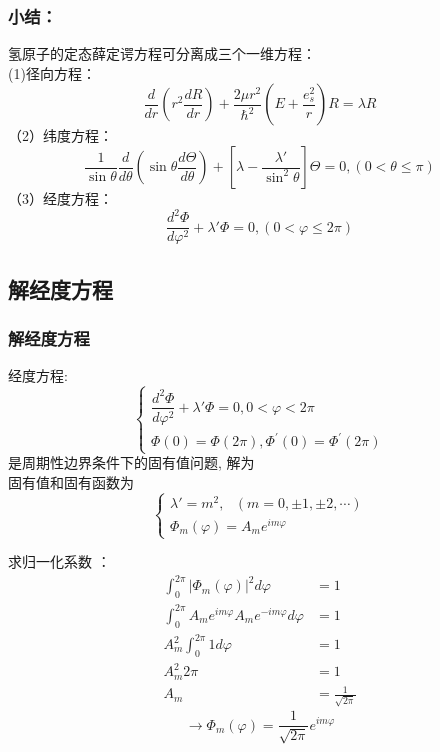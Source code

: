 \begin{frame}[label=current]
\frametitle{小结：}
氢原子的定态薛定谔方程可分离成三个一维方程：\\
(1)径向方程：
\begin{equation*}
  \frac{d}{d r} (r^2\frac{d R }{d r} ) + \frac{2 \mu r^2} {\hbar^2}(E+ \frac{e_s ^2}{r} ) R =\lambda R
\end{equation*}
（2）纬度方程：
\begin{equation*}\label{eq:theta}
  \frac{1}{\sin \theta} \frac{d}{d \theta}\left(\sin \theta \frac{d \Theta}{d \theta}\right)+\left[\lambda-\frac{\lambda'}{\sin ^{2} \theta}\right] \Theta=0,(0<\theta \le \pi)
\end{equation*}		
（3）经度方程：
\begin{equation*}\label{eq:varphi}
  \frac{d^{2} \Phi}{d \varphi^{2}}+\lambda' \Phi=0,(0<\varphi\le2 \pi)
\end{equation*}	  

\end{frame} 

\subsection{解经度方程}
\begin{frame}
\frametitle{解经度方程}
经度方程:\\
\[\begin{cases}
  \dfrac{d^{2} \Phi}{d \varphi^{2}}+\lambda' \Phi=0,0<\varphi<2 \pi \\ 
  \Phi(0)=\Phi(2 \pi), \Phi^{\prime}(0)=\Phi^{\prime}(2 \pi)
\end{cases}\]
是周期性边界条件下的固有值问题, 解为\\
固有值和固有函数为
\[\begin{cases}
  \lambda'=m^2, ~~~ (m=0,\pm 1,\pm 2,\cdots) \\ 
  \Phi_m (\varphi)=A_m e^{im\varphi}
\end{cases}\]	
\end{frame}	

\begin{frame}
求归一化系数 ：
\begin{equation*}
\begin{split}
  \int_{0}^{2\pi}  |\Phi_m (\varphi)|^2 d\varphi &= 1 \\
  \int_{0}^{2\pi}  A_m e^{im\varphi} A_m e^{-im\varphi} d\varphi &= 1 \\
  A^2_m \int_{0}^{2\pi} 1 d\varphi &= 1 \\
  A^2_m 2\pi &= 1 \\
  A_m&=\frac{1}{\sqrt{2\pi}} 
\end{split}
\end{equation*}	
\begin{equation*}
\to 	\Phi_m (\varphi)=\frac{1}{\sqrt{2\pi}} e^{im\varphi}
\end{equation*}	
\end{frame}	

